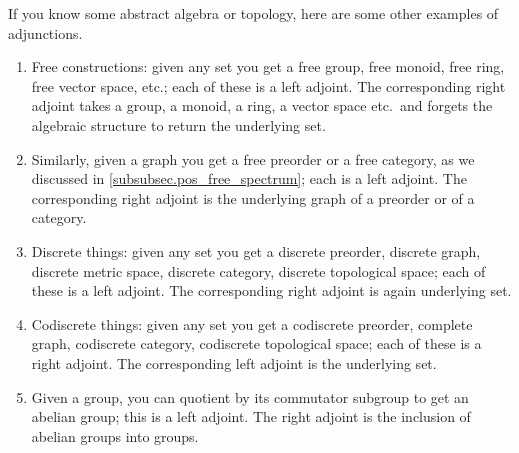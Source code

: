 \documentclass[7Sketches]{subfiles}
\begin{document}
\begin{example}%
\label{ex.adjunctions}%
If you know some abstract algebra or topology, here are some other examples of adjunctions.
\begin{enumerate}
	\item Free constructions: given any set you get a free group, free monoid, free ring, free vector space, etc.; each of these is a left adjoint. The corresponding right adjoint takes a group, a monoid, a ring, a vector space etc.\ and forgets the algebraic structure to return the underlying set. %
	
	\item Similarly, given a graph you get a free preorder or a free
	category, as we discussed in \cref{subsubsec.pos_free_spectrum}; each is
	a left adjoint. The corresponding right adjoint is the underlying graph
	of a preorder or of a category.

	\item Discrete things: given any set you get a discrete preorder,
	discrete graph, discrete metric space, discrete category, discrete
	topological space; each of
	these is a left adjoint. The corresponding right adjoint is again
	underlying set. 

	\item Codiscrete things: given any set you get a codiscrete preorder,
	complete graph, codiscrete category, codiscrete topological space; each
	of these is a right adjoint. The corresponding left adjoint is the
	underlying set.

	\item Given a group, you can quotient by its commutator subgroup to get an abelian group; this is a left adjoint. The right adjoint is the inclusion of abelian groups into groups.
	\qedhere%
\end{enumerate}
\end{example}

\end{document}
